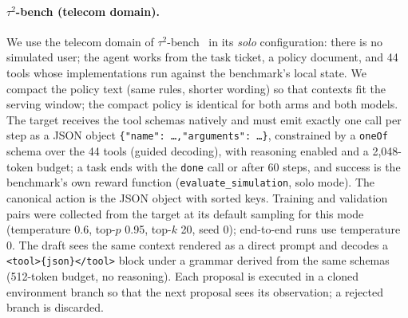 \paragraph{$\tau^2$-bench (telecom domain).}
We use the telecom domain of $\tau^2$-bench~\citep{tau2bench} in its
\emph{solo} configuration: there is no simulated user; the agent works from the
task ticket, a policy document, and 44 tools whose implementations run against
the benchmark's local state. We compact the policy text (same rules, shorter
wording) so that contexts fit the serving window; the compact policy is
identical for both arms and both models. The target receives the tool schemas
natively and must emit exactly one call per step as a JSON object
\texttt{\{"name":\,\ldots,"arguments":\,\ldots\}}, constrained by a
\texttt{oneOf} schema over the 44 tools (guided decoding), with reasoning
enabled and a 2{,}048-token budget; a task ends with the \texttt{done} call or
after 60 steps, and success is the benchmark's own reward function
(\texttt{evaluate\_simulation}, solo mode). The canonical action is the JSON
object with sorted keys. Training and validation pairs were collected from the
target at its default sampling for this mode (temperature 0.6, top-$p$ 0.95,
top-$k$ 20, seed 0); end-to-end runs use temperature 0. The draft sees the same
context rendered as a direct prompt and decodes a \texttt{<tool>\{json\}</tool>}
block under a grammar derived from the same schemas (512-token budget, no
reasoning). Each proposal is executed in a cloned environment branch so that
the next proposal sees its observation; a rejected branch is discarded.


